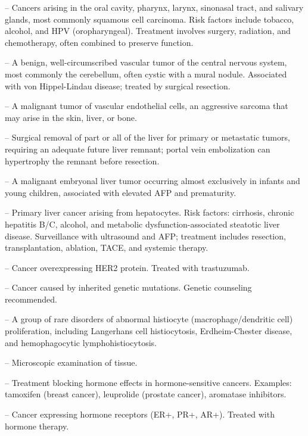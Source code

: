-- Cancers arising in the oral cavity, pharynx, larynx, sinonasal tract, and salivary glands, most commonly squamous cell carcinoma. Risk factors include tobacco, alcohol, and HPV (oropharyngeal). Treatment involves surgery, radiation, and chemotherapy, often combined to preserve function.

-- A benign, well-circumscribed vascular tumor of the central nervous system, most commonly the cerebellum, often cystic with a mural nodule. Associated with von Hippel-Lindau disease; treated by surgical resection.

-- A malignant tumor of vascular endothelial cells, an aggressive sarcoma that may arise in the skin, liver, or bone.

-- Surgical removal of part or all of the liver for primary or metastatic tumors, requiring an adequate future liver remnant; portal vein embolization can hypertrophy the remnant before resection.

-- A malignant embryonal liver tumor occurring almost exclusively in infants and young children, associated with elevated AFP and prematurity.

-- Primary liver cancer arising from hepatocytes. Risk factors: cirrhosis, chronic hepatitis B/C, alcohol, and metabolic dysfunction-associated steatotic liver disease. Surveillance with ultrasound and AFP; treatment includes resection, transplantation, ablation, TACE, and systemic therapy.

-- Cancer overexpressing HER2 protein. Treated with trastuzumab.

-- Cancer caused by inherited genetic mutations. Genetic counseling recommended.

-- A group of rare disorders of abnormal histiocyte (macrophage/dendritic cell) proliferation, including Langerhans cell histiocytosis, Erdheim-Chester disease, and hemophagocytic lymphohistiocytosis.

-- Microscopic examination of tissue.


-- Treatment blocking hormone effects in hormone-sensitive cancers. Examples: tamoxifen (breast cancer), leuprolide (prostate cancer), aromatase inhibitors.


-- Cancer expressing hormone receptors (ER+, PR+, AR+). Treated with hormone therapy.

